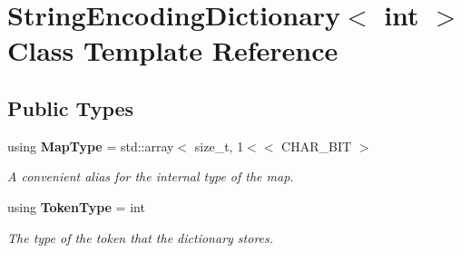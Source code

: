 \section{String\+Encoding\+Dictionary$<$ int $>$ Class Template Reference}
\label{classmlpack_1_1data_1_1StringEncodingDictionary_3_01int_01_4}
\subsection*{Public Types}
\begin{DoxyCompactItemize}
\item 
using \textbf{ Map\+Type} = std\+::array$<$ size\+\_\+t, 1$<$$<$ C\+H\+A\+R\+\_\+\+B\+IT $>$
\begin{DoxyCompactList}\small\item\em A convenient alias for the internal type of the map. \end{DoxyCompactList}\item 
using \textbf{ Token\+Type} = int
\begin{DoxyCompactList}\small\item\em The type of the token that the dictionary stores. \end{DoxyCompactList}\end{DoxyCompactItemize}
